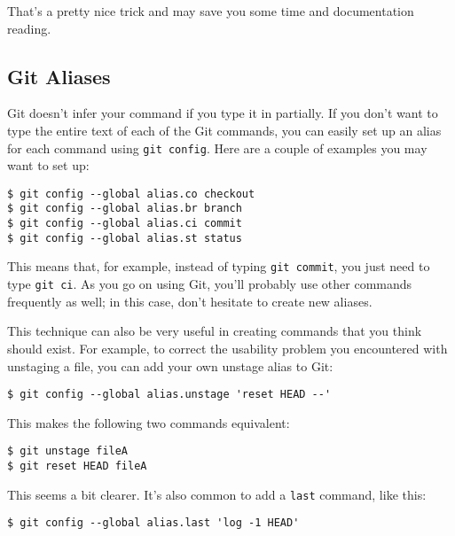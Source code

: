 \documentclass[a4paper]{book}
\begin{document}
That's a pretty nice trick and may save you some time and documentation reading.

\subsection{Git Aliases}\label{git-aliases}

Git doesn't infer your command if you type it in partially. If you don't want to type the entire text of each of the Git commands, you can easily set up an alias for each command using \texttt{git config}. Here are a couple of examples you may want to set up:

\begin{shaded}\begin{verbatim}
$ git config --global alias.co checkout
$ git config --global alias.br branch
$ git config --global alias.ci commit
$ git config --global alias.st status
\end{verbatim}\end{shaded}

This means that, for example, instead of typing \texttt{git commit}, you just need to type \texttt{git ci}. As you go on using Git, you'll probably use other commands frequently as well; in this case, don't hesitate to create new aliases.

This technique can also be very useful in creating commands that you think should exist. For example, to correct the usability problem you encountered with unstaging a file, you can add your own unstage alias to Git:

\begin{shaded}\begin{verbatim}
$ git config --global alias.unstage 'reset HEAD --'
\end{verbatim}\end{shaded}

This makes the following two commands equivalent:

\begin{shaded}\begin{verbatim}
$ git unstage fileA
$ git reset HEAD fileA
\end{verbatim}\end{shaded}

This seems a bit clearer. It's also common to add a \texttt{last} command, like this:

\begin{shaded}\begin{verbatim}
$ git config --global alias.last 'log -1 HEAD'
\end{verbatim}\end{shaded}
\end{document}
